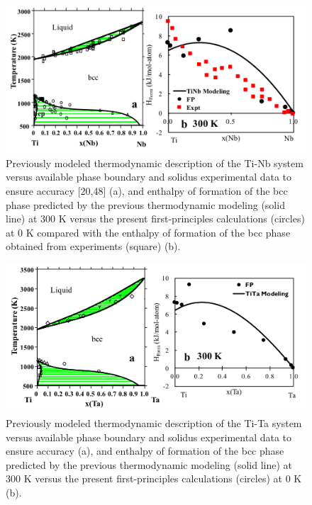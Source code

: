 \newpage
\begin{figure}[H]
	\centering
	\includegraphics[width=\textwidth]{Chapter-3/Figures/TiNb.png}
	\caption{Previously modeled thermodynamic description of the Ti-Nb system versus available phase boundary and solidus experimental data to ensure accuracy \cite{Zhang2001,Kumar1994,Kumar1994a}[20,48] (a), and enthalpy of formation of the bcc phase predicted by the previous thermodynamic modeling (solid line) at 300 K versus the present first-principles calculations (circles) at 0 K compared with the enthalpy of formation of the bcc phase obtained from experiments (square) \cite{Uesugi2013} (b).}
	\label{Ch3-figure:TiNb}
\end{figure}

\newpage
\begin{figure}[H]
	\centering
	\includegraphics[width=\textwidth]{Chapter-3/Figures/TiTa.png}
	\caption{Previously modeled thermodynamic description of the Ti-Ta system versus available phase boundary and solidus experimental data to ensure accuracy \cite{Murray1987,Ansara1998} (a), and enthalpy of formation of the bcc phase predicted by the previous thermodynamic modeling (solid line) at 300 K versus the present first-principles calculations (circles) at 0 K (b).}
	\label{Ch3-figure:TiTa}
\end{figure}

